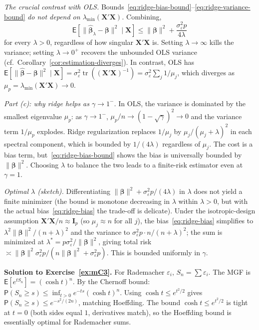 \documentclass[14pt]{extarticle}
\theoremstyle{plain}
\theoremstyle{definition}
\theoremstyle{remark}
\newcommand\expc{\mathsf{E}}
\newcommand\prb{\mathsf{P}}
\DeclareMathOperator\tr{tr}
\newcommand{\bX}{\mathbf{X}}
\def\bb{\boldsymbol{\beta}}
\newcommand{\bI}{\mathbf{I}}
\newcommand{\hbb}{\hat{\boldsymbol{\beta}}}
\begin{document}
\emph{The crucial contrast with OLS.} Bounds~\eqref{eq:ridge-bias-bound}--\eqref{eq:ridge-variance-bound} \emph{do not depend on $\lambda_{\min}(\bX'\bX)$.} Combining,
\[
\expc[\|\hbb_\lambda - \bb\|^2 \mid \bX] \leqslant \|\bb\|^2 + \frac{\sigma_\varepsilon^2 p}{4\lambda}
\]
for every $\lambda > 0$, regardless of how singular $\bX'\bX$ is. Setting $\lambda \to \infty$ kills the variance; setting $\lambda \to 0^+$ recovers the unbounded OLS variance (cf.\ Corollary~\ref{cor:estimation-diverges}). In contrast, OLS has $\expc[\|\hbb - \bb\|^2 \mid \bX] = \sigma_\varepsilon^2 \tr((\bX'\bX)^{-1}) = \sigma_\varepsilon^2 \sum_j 1/\mu_j$, which diverges as $\mu_p = \lambda_{\min}(\bX'\bX) \to 0$.

\emph{Part (c): why ridge helps as $\gamma \to 1^-$.} In OLS, the variance is dominated by the smallest eigenvalue $\mu_p$: as $\gamma \to 1^-$, $\mu_p/n \to (1-\sqrt\gamma)^2 \to 0$ and the variance term $1/\mu_p$ explodes. Ridge regularization replaces $1/\mu_j$ by $\mu_j/(\mu_j + \lambda)^2$ in each spectral component, which is bounded by $1/(4\lambda)$ regardless of $\mu_j$. The cost is a bias term, but~\eqref{eq:ridge-bias-bound} shows the bias is universally bounded by $\|\bb\|^2$. Choosing $\lambda$ to balance the two leads to a finite-risk estimator even at $\gamma = 1$.

\emph{Optimal $\lambda$ (sketch).} Differentiating $\|\bb\|^2 + \sigma_\varepsilon^2 p/(4\lambda)$ in $\lambda$ does not yield a finite minimizer (the bound is monotone decreasing in $\lambda$ within $\lambda > 0$, but with the actual bias~\eqref{eq:ridge-bias} the trade-off is delicate). Under the isotropic-design assumption $\bX'\bX/n \approx \bI_p$ (so $\mu_j \approx n$ for all $j$), the bias~\eqref{eq:ridge-bias} simplifies to $\lambda^2 \|\bb\|^2/(n+\lambda)^2$ and the variance to $\sigma_\varepsilon^2 p \cdot n/(n+\lambda)^2$; the sum is minimized at $\lambda^* = p\sigma_\varepsilon^2/\|\bb\|^2$, giving total risk $\asymp \|\bb\|^2\sigma_\varepsilon^2 p/(n\|\bb\|^2 + \sigma_\varepsilon^2 p)$. This is bounded uniformly in $\gamma$.

\textbf{Solution to Exercise~\ref{ex:mC3}.} For Rademacher $\varepsilon_i$, $S_n = \sum \varepsilon_i$. The MGF is $\expc[e^{tS_n}] = (\cosh t)^n$. By the Chernoff bound: $\prb(S_n \geqslant s) \leqslant \inf_{t>0}e^{-ts}(\cosh t)^n$. Using $\cosh t \leqslant e^{t^2/2}$ gives $\prb(S_n \geqslant s) \leqslant e^{-s^2/(2n)}$, matching Hoeffding. The bound $\cosh t \leqslant e^{t^2/2}$ is tight at $t = 0$ (both sides equal $1$, derivatives match), so the Hoeffding bound is essentially optimal for Rademacher sums.
\end{document}
